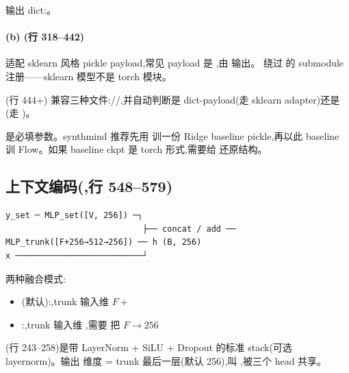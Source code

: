 输出 dict:。

\paragraph{(b) (行 318--442)} 适配 sklearn 风格 pickle payload,常见 payload 是 ,由  输出。 绕过  的 submodule 注册——sklearn 模型不是 torch 模块。

(行 444+) 兼容三种文件://,并自动判断是 dict-payload(走 sklearn adapter)还是 (走 )。

\begin{repobox}[可重复要点 \#1]
 是必填参数。synthmind 推荐先用  训一份 Ridge baseline pickle,再以此 baseline 训 Flow。如果 baseline ckpt 是 torch 形式,需要给  还原结构。
\end{repobox}

\subsection{上下文编码(,行 548--579)}

\begin{lstlisting}
y_set ─ MLP_set([V, 256]) ─┐
                            ├── concat / add ── MLP_trunk([F+256→512→256]) ── h (B, 256)
x ──────────────────────────┘
\end{lstlisting}

两种融合模式:
\begin{itemize}
    \item {}(默认):,trunk 输入维 $F + $ 
    \item {}:,trunk 输入维 ,需要  把 $F \to 256$
\end{itemize}

(行 243--258)是带 LayerNorm + SiLU + Dropout 的标准 stack(可选 layernorm)。输出  维度 = trunk 最后一层(默认 256),叫 ,被三个 head 共享。

